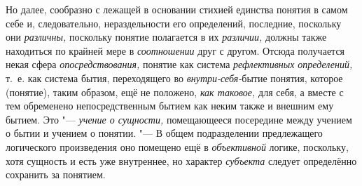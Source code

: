 Но далее, сообразно с лежащей в основании стихией единства понятия в самом
себе и, следовательно, нераздельности его определений, последние, поскольку
они {\em различны,} поскольку понятие полагается в их
{\em различии,} должны также находиться по крайней мере
в {\em соотношении} друг с другом. Отсюда получается
некая сфера {\em опосредствования,} понятие как система
{\em рефлективных определений,} т.~е. как система
бытия, переходящего во {\em внутри-себя-}бытие понятия,
которое (понятие), таким образом, ещё не положено,
{\em как таковое,} для себя, а вместе с тем обременено
непосредственным бытием как неким также и внешним ему бытием. Это
"--- {\em учение о сущности,} помещающееся посередине
между учением о бытии и учением о понятии. "--- В общем подразделении
предлежащего логического произведения оно помещено ещё в
{\em объективной} логике, поскольку, хотя сущность и
есть уже внутреннее, но характер {\em субъекта} следует
определённо сохранить за понятием.

